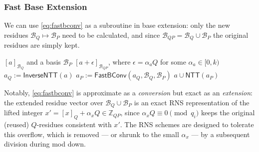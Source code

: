 \subsubsection{Fast Base Extension}
We can use \eqref{eq:fastbconv} as a subroutine in base extension: only the new residues $\mathcal{B}_Q \longmapsto \mathcal{B}_P$ need to be calculated, and since $\mathcal{B}_{QP} = \mathcal{B}_Q\cup \mathcal{B}_P$ the original residues are simply kept.

\begin{algorithm}[ht!]
\caption{Fast Base Extension}
\label{alg:fast_base_extension}
\begin{algorithmic}[1]
    \Require $[a]_{\mathcal{B}_Q}$ and a basis $\mathcal{B}_P$
    \Ensure $[a + \epsilon]_{\mathcal{B}_{QP}}$, where $\epsilon = \alpha_aQ$ for some $\alpha_a\in[0, k)$
    \State $a_{Q} := \mathsf{Inverse NTT}(a)$
    \State $a_{P} := \mathsf{FastBConv}(a_Q, \mathcal{B}_Q, \mathcal{B}_P)$
    \State\Return $a \cup \mathsf{NTT}(a_{P})$
\end{algorithmic}
\end{algorithm}

Notably, \eqref{eq:fastbconv} is approximate as a \textit{conversion} but exact as an \textit{extension}: the extended residue vector over $\mathcal{B}_Q\cup\mathcal{B}_P$ is an exact RNS representation of the lifted integer $x' = [x]_Q + \alpha_x Q \in \mathbb{Z}_{QP}$, since $\alpha_x Q \equiv 0 \pmod{q_i}$ keeps the original (reused) $Q$-residues consistent with $x'$. The RNS schemes are designed to tolerate this overflow, which is removed --- or shrunk to the small $\alpha_x$ --- by a subsequent division during mod down.


